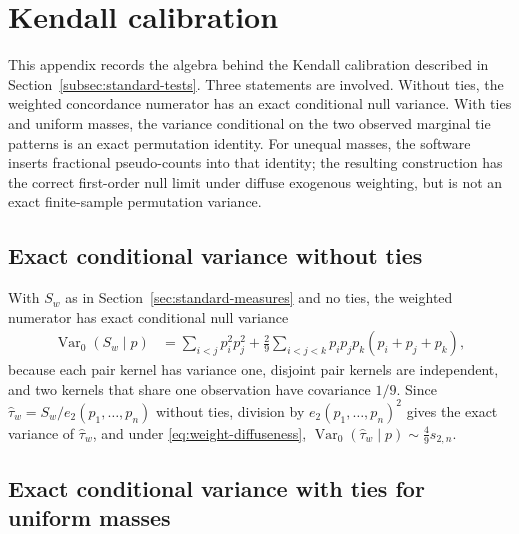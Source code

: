 \section{Kendall calibration}
\label{app:null-asymptotics}

This appendix records the algebra behind the Kendall calibration described in
Section~\ref{subsec:standard-tests}. Three statements are involved. Without
ties, the weighted concordance numerator has an exact conditional null
variance. With ties and uniform masses, the variance conditional on the two
observed marginal tie patterns is an exact permutation identity. For unequal
masses, the software inserts fractional pseudo-counts into that identity; the
resulting construction has the correct first-order null limit under diffuse
exogenous weighting, but is not an exact finite-sample permutation variance.

\subsection{Exact conditional variance without ties}

With $S_w$ as in Section~\ref{sec:standard-measures} and no ties, the
weighted numerator has exact conditional null variance
\begin{align*}
 \operatorname{Var}_0(S_w\mid p)
 &= \sum_{i<j}p_i^2p_j^2
 +\frac{2}{9}\sum_{i<j<k}
 p_ip_jp_k(p_i+p_j+p_k),
\end{align*}
because each pair kernel has variance one, disjoint pair kernels are
independent, and two kernels that share one observation have covariance
$1/9$. Since $\widehat\tau_w=S_w/e_2(p_1,\ldots,p_n)$ without ties, division
by $e_2(p_1,\ldots,p_n)^2$ gives the exact variance of $\widehat\tau_w$, and
under \eqref{eq:weight-diffuseness},
$\operatorname{Var}_0(\widehat\tau_w\mid p)\sim\frac{4}{9}s_{2,n}$.

\subsection{Exact conditional variance with ties for uniform masses}

